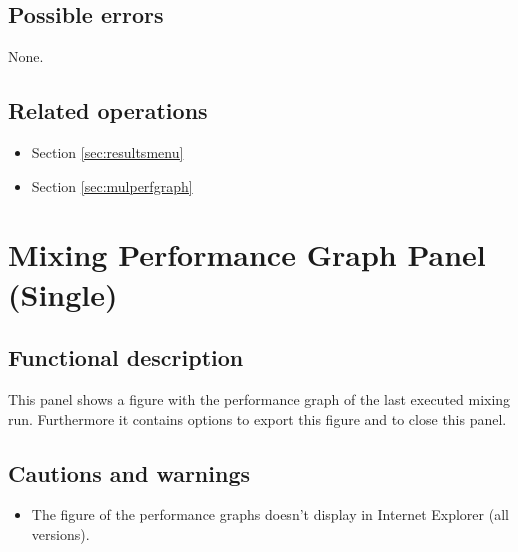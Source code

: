   \subsection*{Possible errors}
  None.

  \subsection*{Related operations}
   \begin{itemize}
   \item Section \ref{sec:resultsmenu}
   \item Section \ref{sec:mulperfgraph}
  \end{itemize}

\section{Mixing Performance Graph Panel (Single)}
\label{sec:singperfgraph}
  \subsection*{Functional description}
  This panel shows a figure with the performance graph of the last executed mixing run. Furthermore it contains options to export this figure and to close this panel.

  \subsection*{Cautions and warnings}
  \begin{itemize}
  \item The figure of the performance graphs doesn't display in Internet Explorer (all versions).
  \end{itemize}

